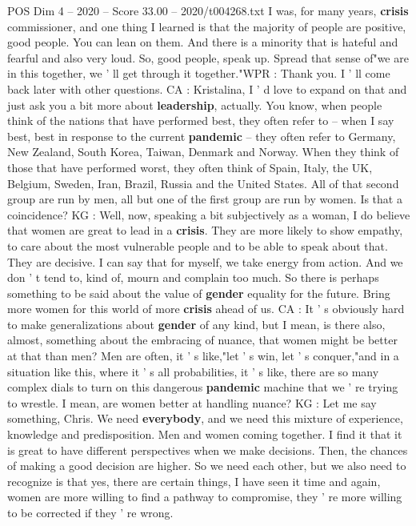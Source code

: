 \begin{textsample}{POS Dim 4 – 2020 – Score 33.00 – 2020/t004268.txt}
I was, for many years, \textbf{crisis} commissioner, and one thing I learned is that the majority of people are positive, good people.
You can lean on them.
And there is a minority that is hateful and fearful and also very loud.
So, good people, speak up.
Spread that sense of"we are in this together, we ' ll get through it together."WPR : Thank you.
I ' ll come back later with other questions.
CA : Kristalina, I ' d love to expand on that and just ask you a bit more about \textbf{leadership}, actually.
You know, when people think of the nations that have performed best, they often refer to -- when I say best, best in response to the current \textbf{pandemic} -- they often refer to Germany, New Zealand, South Korea, Taiwan, Denmark and Norway.
When they think of those that have performed worst, they often think of Spain, Italy, the UK, Belgium, Sweden, Iran, Brazil, Russia and the United States.
All of that second group are run by men, all but one of the first group are run by women.
Is that a coincidence?
KG : Well, now, speaking a bit subjectively as a woman, I do believe that women are great to lead in a \textbf{crisis}.
They are more likely to show empathy, to care about the most vulnerable people and to be able to speak about that.
They are decisive.
I can say that for myself, we take energy from action.
And we don ' t tend to, kind of, mourn and complain too much.
So there is perhaps something to be said about the value of \textbf{gender} equality for the future.
Bring more women for this world of more \textbf{crisis} ahead of us.
CA : It ' s obviously hard to make generalizations about \textbf{gender} of any kind, but I mean, is there also, almost, something about the embracing of nuance, that women might be better at that than men?
Men are often, it ' s like,"let ' s win, let ' s conquer,"and in a situation like this, where it ' s all probabilities, it ' s like, there are so many complex dials to turn on this dangerous \textbf{pandemic} machine that we ' re trying to wrestle.
I mean, are women better at handling nuance?
KG : Let me say something, Chris.
We need \textbf{everybody}, and we need this mixture of experience, knowledge and predisposition.
Men and women coming together.
I find it that it is great to have different perspectives when we make decisions.
Then, the chances of making a good decision are higher.
So we need each other, but we also need to recognize is that yes, there are certain things, I have seen it time and again, women are more willing to find a pathway to compromise, they ' re more willing to be corrected if they ' re wrong.

\end{textsample}
